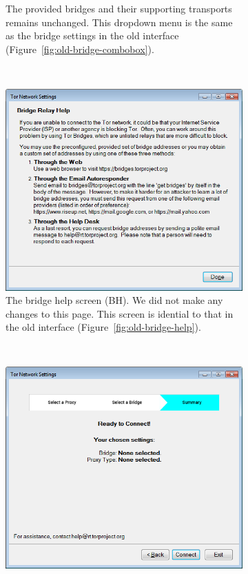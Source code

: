 \documentclass[USenglish,oneside,twocolumn]{article}
\begin{document}
\begin{figure}
\begin{subfigure}[b]{0.30\textwidth}
	\centering\captionsetup{width=1.5\linewidth}%
	\caption{The provided bridges and their supporting transports remains unchanged. This dropdown menu is the same as the bridge settings in the old interface (Figure~\ref{fig:old-bridge-combobox}).}
	\label{fig:new-bridge-combobox}
\end{subfigure}
~~~~~~~~~~~~~~~~~~~~~~~~~
\begin{subfigure}[b]{0.30\textwidth}
	\includegraphics[width=\textwidth]{screenshots/NEW-bridgeHelp.png}
	\centering\captionsetup{width=1.5\linewidth}%
	\caption{The bridge help screen (BH). We did not make any changes to this page. This screen is idential to that in the old interface (Figure~\ref{fig:old-bridge-help}).}
	\label{fig:new-bridge-help}
\end{subfigure}
~~~~~~~~~~
\begin{subfigure}[b]{0.30\textwidth}
	\includegraphics[width=\textwidth]{screenshots/NEW-summary.png}

\end{subfigure}
\end{figure}
\end{document}
